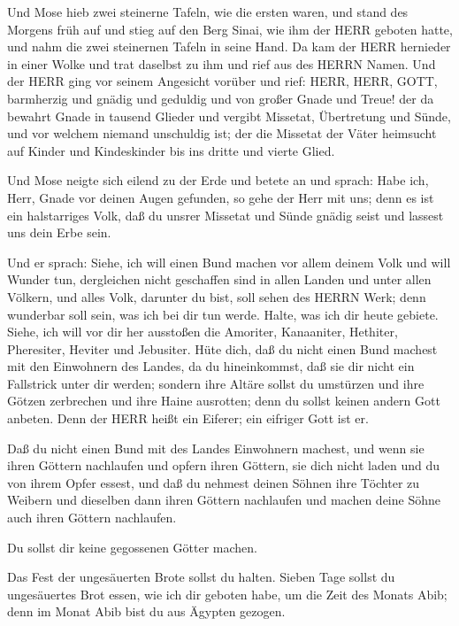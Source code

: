  Und Mose hieb zwei steinerne Tafeln, wie die ersten waren,
und stand des Morgens früh auf und stieg auf den Berg Sinai, wie ihm der
HERR geboten hatte, und nahm die zwei steinernen Tafeln in seine Hand.
 Da kam der HERR hernieder in einer Wolke und trat daselbst
zu ihm und rief aus des HERRN Namen.  Und der HERR ging vor
seinem Angesicht vorüber und rief: HERR, HERR, GOTT, barmherzig und
gnädig und geduldig und von großer Gnade und Treue!  der da
bewahrt Gnade in tausend Glieder und vergibt Missetat, Übertretung und
Sünde, und vor welchem niemand unschuldig ist; der die Missetat der
Väter heimsucht auf Kinder und Kindeskinder bis ins dritte und vierte
Glied.

 Und Mose neigte sich eilend zu der Erde und betete an
 und sprach: Habe ich, Herr, Gnade vor deinen Augen
gefunden, so gehe der Herr mit uns; denn es ist ein halstarriges Volk,
daß du unsrer Missetat und Sünde gnädig seist und lassest uns dein Erbe
sein.

 Und er sprach: Siehe, ich will einen Bund machen vor allem
deinem Volk und will Wunder tun, dergleichen nicht geschaffen sind in
allen Landen und unter allen Völkern, und alles Volk, darunter du bist,
soll sehen des HERRN Werk; denn wunderbar soll sein, was ich bei dir tun
werde.  Halte, was ich dir heute gebiete. Siehe, ich will
vor dir her ausstoßen die Amoriter, Kanaaniter, Hethiter, Pheresiter,
Heviter und Jebusiter.  Hüte dich, daß du nicht einen Bund
machest mit den Einwohnern des Landes, da du hineinkommst, daß sie dir
nicht ein Fallstrick unter dir werden;  sondern ihre Altäre
sollst du umstürzen und ihre Götzen zerbrechen und ihre Haine ausrotten;
 denn du sollst keinen andern Gott anbeten. Denn der HERR
heißt ein Eiferer; ein eifriger Gott ist er.

 Daß du nicht einen Bund mit des Landes Einwohnern machest,
und wenn sie ihren Göttern nachlaufen und opfern ihren Göttern, sie dich
nicht laden und du von ihrem Opfer essest,  und daß du
nehmest deinen Söhnen ihre Töchter zu Weibern und dieselben dann ihren
Göttern nachlaufen und machen deine Söhne auch ihren Göttern nachlaufen.

 Du sollst dir keine gegossenen Götter machen.

 Das Fest der ungesäuerten Brote sollst du halten. Sieben
Tage sollst du ungesäuertes Brot essen, wie ich dir geboten habe, um die
Zeit des Monats Abib; denn im Monat Abib bist du aus Ägypten gezogen.

